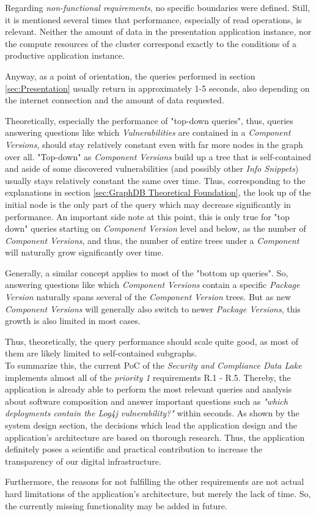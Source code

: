 Regarding \emph{non-functional requirements}, no specific boundaries were defined. Still, it is mentioned several times that performance, especially of read operations, is relevant. Neither the amount of data in the presentation application instance, nor the compute resources of the cluster correspond exactly to the conditions of a productive application instance.\par
Anyway, as a point of orientation, the queries performed in section \ref{sec:Presentation} usually return in approximately 1-5 seconds, also depending on the internet connection and the amount of data requested.\par 
Theoretically, especially the performance of "top-down queries", thus, queries answering questions like which \emph{Vulnerabilities} are contained in a \emph{Component Versions}, should stay relatively constant even with far more nodes in the graph over all. "Top-down" as \emph{Component Versions} build up a tree that is self-contained and aside of some discovered vulnerabilities (and possibly other \emph{Info Snippets}) usually stays relatively constant the same over time. Thus, corresponding to the explanations in section \ref{sec:GraphDB Theoretical Foundation}, the look up of the initial node is the only part of the query which may decrease significantly in performance. An important side note at this point, this is only true for "top down" queries starting on \emph{Component Version} level and below, as the number of \emph{Component Versions}, and thus, the number of entire trees under a \emph{Component} will naturally grow significantly over time.\par
Generally, a similar concept applies to most of the "bottom up queries". So, answering questions like which \emph{Component Versions} contain a specific \emph{Package Version} naturally spans several of the \emph{Component Version} trees. But as new \emph{Component Versions} will generally also switch to newer \emph{Package Versions}, this growth is also limited in most cases.\par
Thus, theoretically, the query performance should scale quite good, as most of them are likely limited to self-contained subgraphs.\\

To summarize this, the current PoC of the \emph{Security and Compliance Data Lake} implements almost all of the \emph{priority 1} requirements R.1 - R.5. Thereby, the application is already able to perform the most relevant queries and analysis about software composition and answer important questions such as \emph{"which deployments contain the Log4j vulnerability?"} within seconds. As shown by the system design section, the decisions which lead the application design and the application's architecture are based on thorough research. Thus, the application definitely poses a scientific and practical contribution to increase the transparency of our digital infrastructure.\par
Furthermore, the reasons for not fulfilling the other requirements are not actual hard limitations of the application's architecture, but merely the lack of time. So, the currently missing functionality may be added in future.

